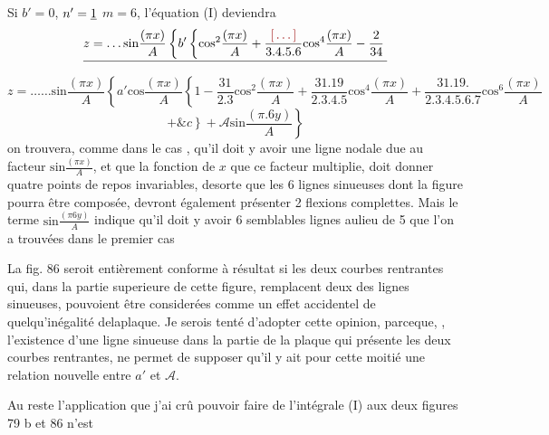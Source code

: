 \documentclass[11pt,a4paper]{article}
\begin{document}

Si   $b' = 0$, $n' = \uncertain{1}$   $m = 6$, l'équation (I) deviendra
\[ \struck{z = \dots \text{sin}\frac{(\pi x)}{A}\left\{b'\left\{\text{cos}^{2}\frac{(\pi x)}{A} + \frac{\ill{}}{3.4.5.6}\text{cos}^{4}\frac{(\pi x)}{A} - \frac{2}{34}\right.\right.} \]
\[ z = \dots\dots \text{sin}\frac{(\pi x)}{A}\left\{a'\text{cos}\frac{(\pi x)}{A}\left\{1 - \frac{31}{2.3}\text{cos}^{2}\frac{(\pi x)}{A} + \frac{31.19}{2.3.4.5}\text{cos}^{4}\frac{(\pi x)}{A} + \frac{31.19.}{2.3.4.5.6.7}\text{cos}^{6}\frac{(\pi x)}{A}\right.\right. \]
\[ \left.\left. + \&c\right\} + \mathcal{A}\text{sin}\frac{(\pi.6y)}{A}\right\} \]
on trouvera, comme dans le cas , qu'il doit y avoir une ligne
nodale  due au facteur $\text{sin}\frac{(\pi x)}{A}$, et que la fonction de $x$
que ce facteur multiplie, doit donner quatre points de repos
invariables, desorte que les 6 lignes sinueuses dont la figure
pourra être composée, devront également présenter 2 flexions
complettes. Mais le terme $\text{sin}\frac{(\pi 6 y)}{A}$ indique qu'il doit
y avoir 6 semblables lignes aulieu de 5 que l'on a
trouvées dans le premier cas

La fig. 86 seroit entièrement conforme à  résultat
si les deux courbes rentrantes qui, dans la partie superieure
de cette figure, remplacent deux des lignes sinueuses,
pouvoient être considerées comme un effet accidentel de
quelqu'inégalité delaplaque. Je serois tenté d'adopter
cette opinion, parceque, , l'existence d'une ligne sinueuse dans
la partie de la plaque qui présente les deux courbes
rentrantes, ne permet   de supposer qu'il y ait pour
cette moitié une relation nouvelle entre $a'$ et $\mathcal{A}$.

Au reste l'application que j'ai crû pouvoir faire de
l'intégrale (I) aux deux figures 79 b et 86 n'est
\end{document}
